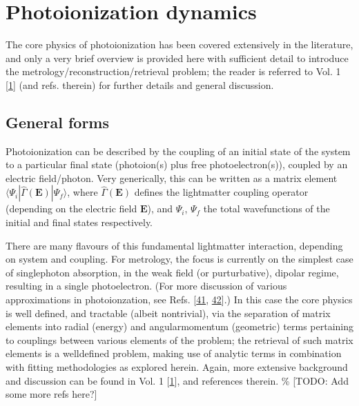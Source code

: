 \documentclass[letterpaper,table,10pt,english]{jupyterBook}
\begin{document}
\section{Photoionization dynamics}
\label{\detokenize{part1/theory_photoionization_dynamics_191122:photoionization-dynamics}}\label{\detokenize{part1/theory_photoionization_dynamics_191122:sec-dynamics-intro}}\label{\detokenize{part1/theory_photoionization_dynamics_191122::doc}}
\sphinxAtStartPar
The core physics of photoionization has been covered extensively in the literature, and only a very brief overview is provided here with sufficient detail to introduce the metrology/reconstruction/retrieval problem; the reader is referred to Vol. 1 {[}\hyperlink{cite.backmatter/bibliography:id613}{1}{]} (and refs. therein) for further details and general discussion.


\subsection{General forms}
\label{\detokenize{part1/theory_photoionization_dynamics_191122:general-forms}}
\sphinxAtStartPar
Photoionization can be described by the coupling of an initial state of the system to a particular final state (photoion(s) plus free photoelectron(s)), coupled by an electric field/photon. Very generically, this can be written as a matrix element \(\langle\Psi_i|\hat{\Gamma}(\boldsymbol{\mathbf{E}})|\Psi_f\rangle\), where \(\hat{\Gamma}(\boldsymbol{\mathbf{E}})\) defines the light\sphinxhyphen{}matter coupling operator (depending on the electric field \(\boldsymbol{\mathbf{E}}\)), and \(\Psi_i\), \(\Psi_f\) the total wavefunctions of the initial and final states respectively.

\sphinxAtStartPar
There are many flavours of this fundamental light\sphinxhyphen{}matter interaction, depending on system and coupling. For metrology, the focus is currently on the simplest case of single\sphinxhyphen{}photon absorption, in the weak field (or purturbative), dipolar regime, resulting in a single photoelectron. (For more discussion of various approximations in photoionzation, see Refs. {[}\hyperlink{cite.backmatter/bibliography:id792}{41}, \hyperlink{cite.backmatter/bibliography:id791}{42}{]}.) In this case the core physics is well defined, and tractable (albeit non\sphinxhyphen{}trivial), via the separation of matrix elements into radial (energy) and angular\sphinxhyphen{}momentum (geometric) terms pertaining to couplings between various elements of the problem; the retrieval of such matrix elements is a well\sphinxhyphen{}defined problem, making use of analytic terms in combination with fitting methodologies as explored herein. Again, more extensive background and discussion can be found in  Vol. 1 {[}\hyperlink{cite.backmatter/bibliography:id613}{1}{]}, and references therein. \% {[}TODO: Add some more refs here?{]}
\end{document}
